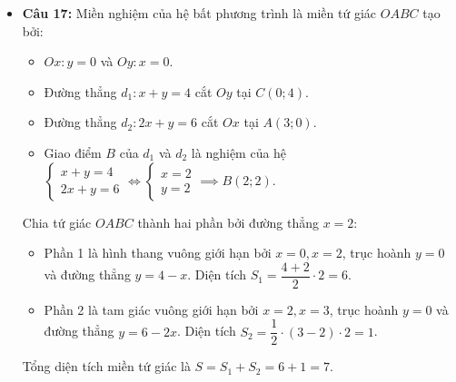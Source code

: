 \documentclass[12pt,a4paper]{article}
\begin{document}
\begin{itemize}[leftmargin=0.6cm, itemsep=1.5pt, topsep=1pt]
    \item \textbf{Câu 17:} Miền nghiệm của hệ bất phương trình là miền tứ giác $OABC$ tạo bởi:
    \begin{itemize}[itemsep=1pt]
        \item $Ox: y = 0$ và $Oy: x = 0$.
        \item Đường thẳng $d_1: x + y = 4$ cắt $Oy$ tại $C(0; 4)$.
        \item Đường thẳng $d_2: 2x + y = 6$ cắt $Ox$ tại $A(3; 0)$.
        \item Giao điểm $B$ của $d_1$ và $d_2$ là nghiệm của hệ $\begin{cases} x + y = 4 \\ 2x + y = 6 \end{cases} \iff \begin{cases} x = 2 \\ y = 2 \end{cases} \implies B(2; 2)$.
    \end{itemize}
    Chia tứ giác $OABC$ thành hai phần bởi đường thẳng $x = 2$:
    \begin{itemize}[itemsep=1pt]
        \item Phần 1 là hình thang vuông giới hạn bởi $x = 0, x = 2$, trục hoành $y = 0$ và đường thẳng $y = 4 - x$. Diện tích $S_1 = \dfrac{4 + 2}{2} \cdot 2 = 6$.
        \item Phần 2 là tam giác vuông giới hạn bởi $x = 2, x = 3$, trục hoành $y = 0$ và đường thẳng $y = 6 - 2x$. Diện tích $S_2 = \dfrac{1}{2} \cdot (3 - 2) \cdot 2 = 1$.
    \end{itemize}
    Tổng diện tích miền tứ giác là $S = S_1 + S_2 = 6 + 1 = 7$.


\end{itemize}
\end{document}

